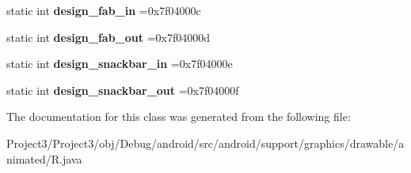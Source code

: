 \begin{DoxyCompactItemize}
static int {\bfseries design\+\_\+fab\+\_\+in} =0x7f04000c
\item 
\mbox{\label{classandroid_1_1support_1_1graphics_1_1drawable_1_1animated_1_1R_1_1anim_aef812207b0d40cf129c4555ebae7ca1e}} 
static int {\bfseries design\+\_\+fab\+\_\+out} =0x7f04000d
\item 
\mbox{\label{classandroid_1_1support_1_1graphics_1_1drawable_1_1animated_1_1R_1_1anim_a35db4eecc4659e7029188fb8a77e0167}} 
static int {\bfseries design\+\_\+snackbar\+\_\+in} =0x7f04000e
\item 
\mbox{\label{classandroid_1_1support_1_1graphics_1_1drawable_1_1animated_1_1R_1_1anim_a3d5c2c7753a71e38e110da63f1d5f7b3}} 
static int {\bfseries design\+\_\+snackbar\+\_\+out} =0x7f04000f
\end{DoxyCompactItemize}


The documentation for this class was generated from the following file\+:\begin{DoxyCompactItemize}
\item 
Project3/\+Project3/obj/\+Debug/android/src/android/support/graphics/drawable/animated/R.\+java\end{DoxyCompactItemize}
